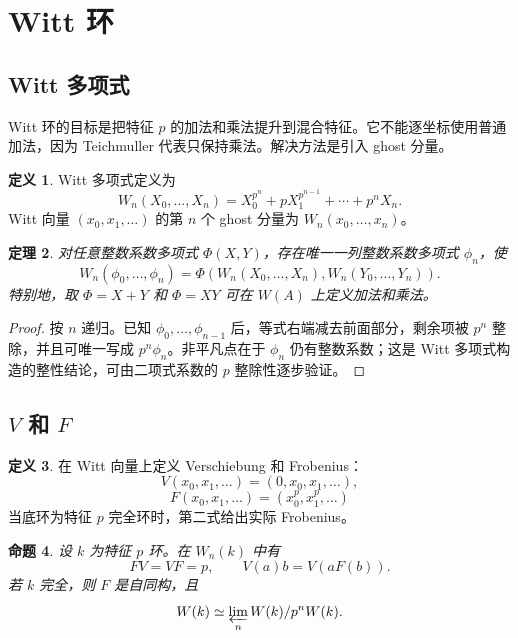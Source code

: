 \documentclass[11pt,a4paper,openany]{ctexbook}
\numberwithin{equation}{chapter}
\theoremstyle{plain}
\newtheorem{theorem}{定理}[chapter]
\newtheorem{proposition}[theorem]{命题}
\theoremstyle{definition}
\newtheorem{definition}[theorem]{定义}
\theoremstyle{remark}
\begin{document}
\section{Witt 环}

\subsection{Witt 多项式}

Witt 环的目标是把特征 $p$ 的加法和乘法提升到混合特征。它不能逐坐标使用普通加法，因为 Teichmuller 代表只保持乘法。解决方法是引入 ghost 分量。

\begin{definition}
Witt 多项式定义为
\[
  W_n(X_0,\ldots,X_n)=X_0^{p^n}+pX_1^{p^{n-1}}+\cdots+p^nX_n.
\]
Witt 向量 $(x_0,x_1,\ldots)$ 的第 $n$ 个 ghost 分量为 $W_n(x_0,\ldots,x_n)$。
\end{definition}

\begin{theorem}
对任意整数系数多项式 $\Phi(X,Y)$，存在唯一一列整数系数多项式 $\phi_n$，使
\[
  W_n(\phi_0,\ldots,\phi_n)=\Phi(W_n(X_0,\ldots,X_n),W_n(Y_0,\ldots,Y_n)).
\]
特别地，取 $\Phi=X+Y$ 和 $\Phi=XY$ 可在 $W(A)$ 上定义加法和乘法。
\end{theorem}

\begin{proof}
按 $n$ 递归。已知 $\phi_0,\ldots,\phi_{n-1}$ 后，等式右端减去前面部分，剩余项被 $p^n$ 整除，并且可唯一写成 $p^n\phi_n$。非平凡点在于 $\phi_n$ 仍有整数系数；这是 Witt 多项式构造的整性结论，可由二项式系数的 $p$ 整除性逐步验证。
\end{proof}

\subsection{\texorpdfstring{$V$ 和 $F$}{V 和 F}}

\begin{definition}
在 Witt 向量上定义 Verschiebung 和 Frobenius：
\[
  V(x_0,x_1,\ldots)=(0,x_0,x_1,\ldots),
\]
\[
  F(x_0,x_1,\ldots)=(x_0^p,x_1^p,\ldots)
\]
当底环为特征 $p$ 完全环时，第二式给出实际 Frobenius。
\end{definition}

\begin{proposition}
设 $k$ 为特征 $p$ 环。在 $W_n(k)$ 中有
\[
  FV=VF=p,\qquad V(a) b=V(aF(b)).
\]
若 $k$ 完全，则 $F$ 是自同构，且
\[
  W(k)\simeq\varprojlim_n W(k)/p^nW(k).
\]
\end{proposition}
\end{document}
